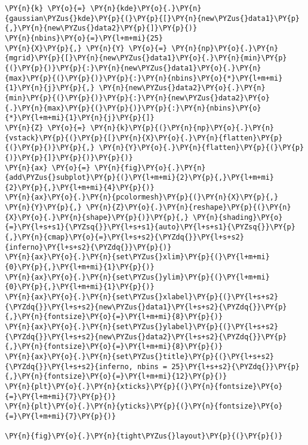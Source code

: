 \begin{tcolorbox}[breakable, size=fbox, boxrule=1pt, pad at break*=1mm,colback=cellbackground, colframe=cellborder]
\begin{Verbatim}[commandchars=\\\{\}]
\PY{n}{k} \PY{o}{=} \PY{n}{kde}\PY{o}{.}\PY{n}{gaussian\PYZus{}kde}\PY{p}{(}\PY{p}{[}\PY{n}{new\PYZus{}data1}\PY{p}{,}\PY{n}{new\PYZus{}data2}\PY{p}{]}\PY{p}{)}
\PY{n}{nbins}\PY{o}{=}\PY{l+m+mi}{25}
\PY{n}{X}\PY{p}{,} \PY{n}{Y} \PY{o}{=} \PY{n}{np}\PY{o}{.}\PY{n}{mgrid}\PY{p}{[}\PY{n}{new\PYZus{}data1}\PY{o}{.}\PY{n}{min}\PY{p}{(}\PY{p}{)}\PY{p}{:}\PY{n}{new\PYZus{}data1}\PY{o}{.}\PY{n}{max}\PY{p}{(}\PY{p}{)}\PY{p}{:}\PY{n}{nbins}\PY{o}{*}\PY{l+m+mi}{1}\PY{n}{j}\PY{p}{,} \PY{n}{new\PYZus{}data2}\PY{o}{.}\PY{n}{min}\PY{p}{(}\PY{p}{)}\PY{p}{:}\PY{n}{new\PYZus{}data2}\PY{o}{.}\PY{n}{max}\PY{p}{(}\PY{p}{)}\PY{p}{:}\PY{n}{nbins}\PY{o}{*}\PY{l+m+mi}{1}\PY{n}{j}\PY{p}{]}
\PY{n}{Z} \PY{o}{=} \PY{n}{k}\PY{p}{(}\PY{n}{np}\PY{o}{.}\PY{n}{vstack}\PY{p}{(}\PY{p}{[}\PY{n}{X}\PY{o}{.}\PY{n}{flatten}\PY{p}{(}\PY{p}{)}\PY{p}{,} \PY{n}{Y}\PY{o}{.}\PY{n}{flatten}\PY{p}{(}\PY{p}{)}\PY{p}{]}\PY{p}{)}\PY{p}{)}
\PY{n}{ax} \PY{o}{=} \PY{n}{fig}\PY{o}{.}\PY{n}{add\PYZus{}subplot}\PY{p}{(}\PY{l+m+mi}{2}\PY{p}{,}\PY{l+m+mi}{2}\PY{p}{,}\PY{l+m+mi}{4}\PY{p}{)}
\PY{n}{ax}\PY{o}{.}\PY{n}{pcolormesh}\PY{p}{(}\PY{n}{X}\PY{p}{,} \PY{n}{Y}\PY{p}{,} \PY{n}{Z}\PY{o}{.}\PY{n}{reshape}\PY{p}{(}\PY{n}{X}\PY{o}{.}\PY{n}{shape}\PY{p}{)}\PY{p}{,} \PY{n}{shading}\PY{o}{=}\PY{l+s+s1}{\PYZsq{}}\PY{l+s+s1}{auto}\PY{l+s+s1}{\PYZsq{}}\PY{p}{,}\PY{n}{cmap}\PY{o}{=}\PY{l+s+s2}{\PYZdq{}}\PY{l+s+s2}{inferno}\PY{l+s+s2}{\PYZdq{}}\PY{p}{)}
\PY{n}{ax}\PY{o}{.}\PY{n}{set\PYZus{}xlim}\PY{p}{(}\PY{l+m+mi}{0}\PY{p}{,}\PY{l+m+mi}{1}\PY{p}{)}
\PY{n}{ax}\PY{o}{.}\PY{n}{set\PYZus{}ylim}\PY{p}{(}\PY{l+m+mi}{0}\PY{p}{,}\PY{l+m+mi}{1}\PY{p}{)}
\PY{n}{ax}\PY{o}{.}\PY{n}{set\PYZus{}xlabel}\PY{p}{(}\PY{l+s+s2}{\PYZdq{}}\PY{l+s+s2}{new\PYZus{}data1}\PY{l+s+s2}{\PYZdq{}}\PY{p}{,}\PY{n}{fontsize}\PY{o}{=}\PY{l+m+mi}{8}\PY{p}{)}
\PY{n}{ax}\PY{o}{.}\PY{n}{set\PYZus{}ylabel}\PY{p}{(}\PY{l+s+s2}{\PYZdq{}}\PY{l+s+s2}{new\PYZus{}data2}\PY{l+s+s2}{\PYZdq{}}\PY{p}{,}\PY{n}{fontsize}\PY{o}{=}\PY{l+m+mi}{8}\PY{p}{)}
\PY{n}{ax}\PY{o}{.}\PY{n}{set\PYZus{}title}\PY{p}{(}\PY{l+s+s2}{\PYZdq{}}\PY{l+s+s2}{inferno, nbins = 25}\PY{l+s+s2}{\PYZdq{}}\PY{p}{,}\PY{n}{fontsize}\PY{o}{=}\PY{l+m+mi}{12}\PY{p}{)}
\PY{n}{plt}\PY{o}{.}\PY{n}{xticks}\PY{p}{(}\PY{n}{fontsize}\PY{o}{=}\PY{l+m+mi}{7}\PY{p}{)}
\PY{n}{plt}\PY{o}{.}\PY{n}{yticks}\PY{p}{(}\PY{n}{fontsize}\PY{o}{=}\PY{l+m+mi}{7}\PY{p}{)}

\PY{n}{fig}\PY{o}{.}\PY{n}{tight\PYZus{}layout}\PY{p}{(}\PY{p}{)}
\end{Verbatim}
\end{tcolorbox}

    \begin{center}
    \end{center}
    { \hspace*{\fill} \\}
    
